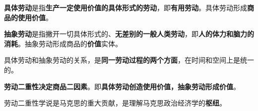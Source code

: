 \textbf{{具体劳动}}是指\textbf{{生产一定使用价值的具体形式的劳动}}，即\textbf{{有用劳动}}。具体劳动形成\textbf{{商品的使用价值}}。

\textbf{{抽象劳动}}是指撇开一切具体形式的、\textbf{{无差别的一般人类劳动}}，即\textbf{{人的体力和脑力的消耗}}。抽象劳动形成商品的\textbf{{价值}}实体。

具体劳动和抽象劳动的关系，是\textbf{{同一劳动过程的两个方面}}，在时间和空间上是统一的。

\textbf{{劳动二重性决定商品二因素}}{。即}\textbf{{具体劳动创造使用价值，抽象劳动形成价值}}{。}

{劳动二重性学说是马克思的重大贡献，是理解马克思政治经济学的}\textbf{{枢纽}}{。}
